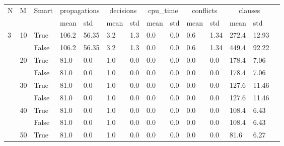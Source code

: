 \documentclass{article}
\begin{document}
\begin{landscape}
\begin{small}
\begin{longtable}[c]{@{}lll|ll|ll|ll|ll|lll@{}}
\toprule
N  & M  & Smart & \multicolumn{2}{c}{propagations} & \multicolumn{2}{c}{decisions} & \multicolumn{2}{c}{cpu\_time} & \multicolumn{2}{c}{conflicts} & \multicolumn{2}{c}{clauses} &  \\* 
   &    &       & mean            & std            & mean          & std           & mean          & std           & mean          & std           & mean          & std         &  \\
  \midrule
\endfirsthead
%
\endhead
%
\bottomrule
\endfoot
%
\endlastfoot
%
3  & 10 & True  & 106.2           & 56.35          & 3.2           & 1.3           & 0.0           & 0.0           & 0.6           & 1.34          & 272.4         & 12.93       &  \\
   &    & False & 106.2           & 56.35          & 3.2           & 1.3           & 0.0           & 0.0           & 0.6           & 1.34          & 449.4         & 92.22       &  \\
   & 20 & True  & 81.0            & 0.0            & 1.0           & 0.0           & 0.0           & 0.0           & 0.0           & 0.0           & 178.4         & 7.06        &  \\
   &    & False & 81.0            & 0.0            & 1.0           & 0.0           & 0.0           & 0.0           & 0.0           & 0.0           & 178.4         & 7.06        &  \\
   & 30 & True  & 81.0            & 0.0            & 1.0           & 0.0           & 0.0           & 0.0           & 0.0           & 0.0           & 127.6         & 11.46       &  \\
   &    & False & 81.0            & 0.0            & 1.0           & 0.0           & 0.0           & 0.0           & 0.0           & 0.0           & 127.6         & 11.46       &  \\
   & 40 & True  & 81.0            & 0.0            & 1.0           & 0.0           & 0.0           & 0.0           & 0.0           & 0.0           & 108.4         & 6.43        &  \\
   &    & False & 81.0            & 0.0            & 1.0           & 0.0           & 0.0           & 0.0           & 0.0           & 0.0           & 108.4         & 6.43        &  \\
   & 50 & True  & 81.0            & 0.0            & 1.0           & 0.0           & 0.0           & 0.0           & 0.0           & 0.0           & 81.6          & 6.27        &  \\

\end{longtable}
\end{small}
\end{landscape}
\end{document}
